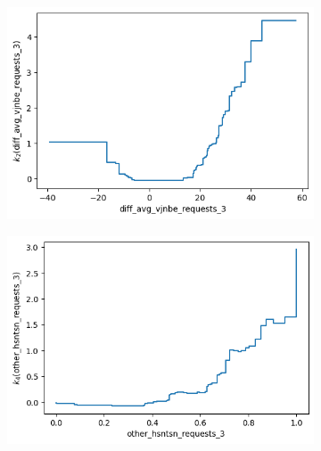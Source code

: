 \documentclass[12pt,titlepage]{article}
\begin{document}
\begin{figure}
\begin{subfigure}{.55\textwidth}
        \end{subfigure} \\
        \begin{subfigure}{.55\textwidth}
            \centering
            \includegraphics[width=1\linewidth]{shape_function_diff_avg_vjnbe_requests_3.png}
        \end{subfigure}%
        \begin{subfigure}{.55\textwidth}
            \centering
            \includegraphics[width=1\linewidth]{shape_function_other_hsntsn_requests_3.png}
        \end{subfigure} \\
        \begin{subfigure}{.55\textwidth}
            \centering

\end{subfigure}
\end{figure}
\end{document}
